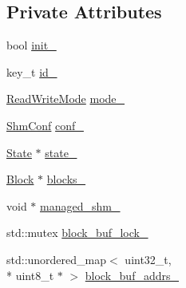 \subsection*{Private Attributes}
\begin{DoxyCompactItemize}
\item 
bool \hyperlink{classapollo_1_1cyber_1_1transport_1_1Segment_a5ffa8fc8020741fe2cd065a185dfec72}{init\-\_\-}
\item 
key\-\_\-t \hyperlink{classapollo_1_1cyber_1_1transport_1_1Segment_a43c86ced180f817e91aa0cba66491d71}{id\-\_\-}
\item 
\hyperlink{namespaceapollo_1_1cyber_1_1transport_a020d15a7a063c0bdae65bd0a96c4a960}{Read\-Write\-Mode} \hyperlink{classapollo_1_1cyber_1_1transport_1_1Segment_ae476c5fa5e5011249836d36f69379c6c}{mode\-\_\-}
\item 
\hyperlink{classapollo_1_1cyber_1_1transport_1_1ShmConf}{Shm\-Conf} \hyperlink{classapollo_1_1cyber_1_1transport_1_1Segment_a8c1cd9da8ef8e4fd13f91873155440d6}{conf\-\_\-}
\item 
\hyperlink{classapollo_1_1cyber_1_1transport_1_1State}{State} $\ast$ \hyperlink{classapollo_1_1cyber_1_1transport_1_1Segment_af18b71bafdc13c212ff424b8f0f91591}{state\-\_\-}
\item 
\hyperlink{classapollo_1_1cyber_1_1transport_1_1Block}{Block} $\ast$ \hyperlink{classapollo_1_1cyber_1_1transport_1_1Segment_a24f1e0ef673533da49b75c6c572eb618}{blocks\-\_\-}
\item 
void $\ast$ \hyperlink{classapollo_1_1cyber_1_1transport_1_1Segment_a47d9f6f69188095dc7147e1cc0bbe271}{managed\-\_\-shm\-\_\-}
\item 
std\-::mutex \hyperlink{classapollo_1_1cyber_1_1transport_1_1Segment_a6e2beef8f3df98c0cde70f4024442c45}{block\-\_\-buf\-\_\-lock\-\_\-}
\item 
std\-::unordered\-\_\-map$<$ uint32\-\_\-t, \\*
uint8\-\_\-t $\ast$ $>$ \hyperlink{classapollo_1_1cyber_1_1transport_1_1Segment_ac7f83a4f44cbb525f9f4755096195c5e}{block\-\_\-buf\-\_\-addrs\-\_\-}
\end{DoxyCompactItemize}


